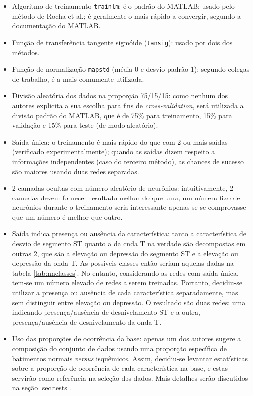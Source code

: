 \begin{itemize}
    \item Algoritmo de treinamento \texttt{trainlm}: é o padrão do MATLAB; usado pelo método de Rocha et al.; é geralmente o mais rápido a convergir, segundo a documentação do MATLAB.
    \item Função de transferência tangente sigmóide (\texttt{tansig}): usado por dois dos métodos.
    \item Função de normalização \texttt{mapstd} (média 0 e desvio padrão 1): segundo colegas de trabalho, é a mais comumente utilizada.
    \item Divisão aleatória dos dados na proporção 75/15/15: como nenhum dos autores explicita a sua escolha para fins de \emph{cross-validation}, será utilizada a divisão padrão do MATLAB, que é de 75\% para treinamento, 15\% para validação e 15\% para teste (de modo aleatório).
    \item Saída única: o treinamento é mais rápido do que com 2 ou mais saídas (verificado experimentalmente); quando as saídas dizem respeito a informações independentes (caso do terceiro método), as chances de sucesso são maiores usando duas redes separadas.
    \item 2 camadas ocultas com número aleatório de neurônios: intuitivamente, 2 camadas devem fornecer resultado melhor do que uma; um número fixo de neurônios durante o treinamento seria interessante apenas se se comprovasse que um número é melhor que outro.
    \item Saída indica presença ou ausência da característica: tanto a característica de desvio de segmento ST quanto a da onda T na verdade são decompostas em outras 2, que são a elevação ou depressão do segmento ST e a elevação ou depressão da onda T. As possíveis classes então seriam aquelas dadas na tabela \ref{tab:nnclasses}. No entanto, considerando as redes com saída única, tem-se um número elevado de redes a serem treinadas. Portanto, decidiu-se utilizar a presença ou ausência de cada característica separadamente, mas sem distinguir entre elevação ou depressão. O resultado são duas redes: uma indicando presença/ausência de desnivelamento ST e a outra, presença/ausência de desnivelamento da onda T.
    \item Uso das proporções de ocorrência da base: apenas um dos autores sugere a composição do conjunto de dados usando uma proporção específica de batimentos normais \emph{versus} isquêmicos. Assim, decidiu-se levantar estatísticas sobre a proporção de ocorrência de cada característica na base, e estas servirão como referência na seleção dos dados. Mais detalhes serão discutidos na seção \ref{sec:tests}.

\end{itemize}
